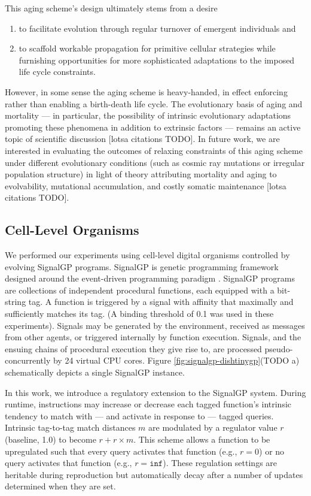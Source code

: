 This aging scheme's design ultimately stems from a desire
\begin{enumerate}
\item to facilitate evolution through regular turnover of emergent individuals and
\item to scaffold workable propagation for primitive cellular strategies while furnishing opportunities for more sophisticated adaptations to the imposed life cycle constraints.
\end{enumerate}
However, in some sense the aging scheme is heavy-handed, in effect enforcing rather than enabling a birth-death life cycle.
The evolutionary basis of aging and mortality --- in particular, the possibility of intrinsic evolutionary adaptations promoting these phenomena in addition to extrinsic factors  --- remains an active topic of scientific discussion [lotsa citations TODO].
In future work, we are interested in evaluating the outcomes of relaxing constraints of this aging scheme under different evolutionary conditions (such as cosmic ray mutations or irregular population structure) in light of theory attributing mortality and aging to evolvability, mutational accumulation, and costly somatic maintenance [lotsa citations TODO].

\subsection{Cell-Level Organisms}



We performed our experiments using cell-level digital organisms controlled by evolving SignalGP programs.
SignalGP is genetic programming framework designed around the event-driven programming paradigm \cite{lalejini2018evolving}.
SignalGP programs are collections of independent procedural functions, each equipped with a bit-string tag.
A function is triggered by a signal with affinity that maximally and sufficiently matches its tag.
(A binding threshold of 0.1 was used in these experiments).
Signals may be generated by the environment, received as messages from other agents, or triggered internally by function execution.
Signals, and the ensuing chains of procedural execution they give rise to, are processed pseudo-concurrently by 24 virtual CPU cores.
Figure \ref{fig:signalgp-dishtinygp}(TODO a) schematically depicts a single SignalGP instance.

In this work, we introduce a regulatory extension to the SignalGP system.
During runtime, instructions may increase or decrease each tagged function's intrinsic tendency to match with --- and activate in response to --- tagged queries.
Intrinsic tag-to-tag match distances $m$ are modulated by a regulator value $r$ (baseline, 1.0) to become $r + r \times m$.
This scheme allows a function to be upregulated such that every query activates that function (e.g., $r = 0$) or no query activates that function (e.g., $r = \texttt{inf}$).
These regulation settings are heritable during reproduction but automatically decay after a number of updates determined when they are set.

